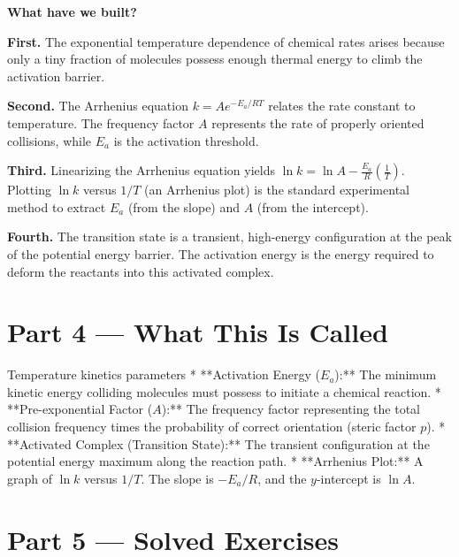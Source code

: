 \documentclass[12pt, a4paper]{book}
\begin{document}
\begin{discoverybox}
\textbf{What have we built?}

\textbf{First.} The exponential temperature dependence of chemical rates arises because only a tiny fraction of molecules possess enough thermal energy to climb the activation barrier.

\textbf{Second.} The Arrhenius equation $k = A e^{-E_a/RT}$ relates the rate constant to temperature. The frequency factor $A$ represents the rate of properly oriented collisions, while $E_a$ is the activation threshold.

\textbf{Third.} Linearizing the Arrhenius equation yields $\ln k = \ln A - \frac{E_a}{R}(\frac{1}{T})$. Plotting $\ln k$ versus $1/T$ (an Arrhenius plot) is the standard experimental method to extract $E_a$ (from the slope) and $A$ (from the intercept).

\textbf{Fourth.} The transition state is a transient, high-energy configuration at the peak of the potential energy barrier. The activation energy is the energy required to deform the reactants into this activated complex.
\end{discoverybox}

\newpage

\section{Part 4 --- What This Is Called}

\begin{namedconcept}{Temperature kinetics parameters}
* **Activation Energy ($E_a$):** The minimum kinetic energy colliding molecules must possess to initiate a chemical reaction.
* **Pre-exponential Factor ($A$):** The frequency factor representing the total collision frequency times the probability of correct orientation (steric factor $p$).
* **Activated Complex (Transition State):** The transient configuration at the potential energy maximum along the reaction path.
* **Arrhenius Plot:** A graph of $\ln k$ versus $1/T$. The slope is $-E_a/R$, and the $y$-intercept is $\ln A$.
\end{namedconcept}

\newpage

\section{Part 5 --- Solved Exercises}
\end{document}
